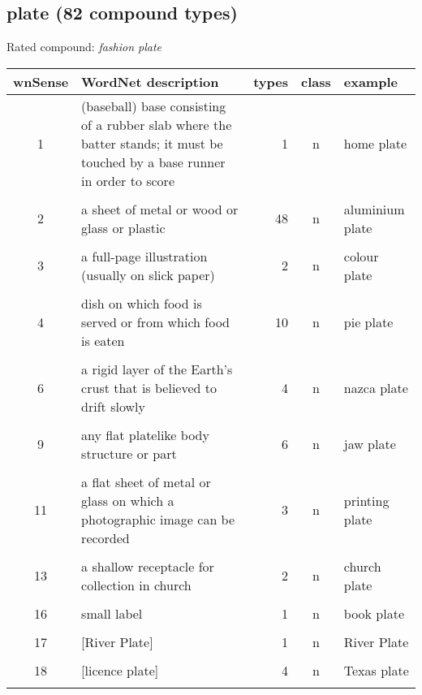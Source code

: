 \pagebreak[4]
\subsection{plate    (82 compound types)}
Rated compound: \emph{fashion plate}

\vspace*{-.2cm}

\noindent
\begin{longtable}{c>{\raggedright\arraybackslash}p{5cm}rc>{\raggedright\arraybackslash}p{2cm}}\lsptoprule
{\small wnSense}&WordNet description&types&class&example\\\midrule
1&(baseball) base consisting of a rubber slab where the batter stands; it must be touched by a base runner in order to score&1&n&home plate\\\\[-.6em]
2&a sheet of metal or wood or glass or plastic&48&n&aluminium plate\\\\[-.6em]
3&a full-page illustration (usually on slick paper)&2&n&colour plate\\\\[-.6em]
4&dish on which food is served or from which food is eaten&10&n&pie plate\\\\[-.6em]
6&a rigid layer of the Earth's crust that is believed to drift slowly&4&n&nazca plate\\\\[-.6em]
9&any flat platelike body structure or part&6&n&jaw plate\\\\[-.6em]
11&a flat sheet of metal or glass on which a photographic image can be recorded&3&n&printing plate\\\\[-.6em]
13&a shallow receptacle for collection in church&2&n&church plate\\\\[-.6em]
16&{}small label&1&n&book plate\\\\[-.6em]
17&{}[River Plate]&1&n&River Plate\\\\[-.6em]
18&{}[licence plate]&4&n&Texas plate\\\lspbottomrule
\end{longtable}
\vspace*{-.2cm}

